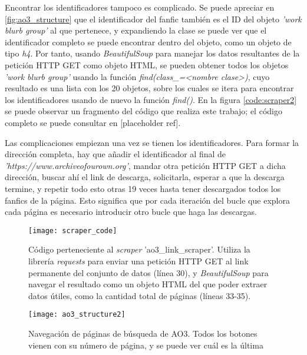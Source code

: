 \documentclass{pre-tfg}
\newcommand{\refToLinkScraperCode}{[placeholder ref]}
\begin{document}
Encontrar los identificadores tampoco es complicado. Se puede apreciar en \ref{fig:ao3_structure} que el identificador del fanfic también es el ID del objeto \textit{'work blurb group'} al que pertenece, y expandiendo la clase se puede ver que el identificador completo se puede encontrar dentro del objeto, como un objeto de tipo \textit{h4}. Por tanto, usando \textit{BeautifulSoup} para manejar los datos resultantes de la petición HTTP GET como objeto HTML, se pueden obtener todos los objetos \textit{'work blurb group'} usando la función \textit{find(class\_=<nombre clase>)}, cuyo resultado es una lista con los 20 objetos, sobre los cuales se itera para encontrar los identificadores usando de nuevo la función \textit{find()}. En la figura \ref{code:scraper2} se puede observar un fragmento del código que realiza este trabajo; el código completo se puede consultar en \refToLinkScraperCode.

Las complicaciones empiezan una vez se tienen los identificadores. Para formar la dirección completa, hay que añadir el identificador al final de \textit{'https://www.archiveofourown.org'}, mandar otra petición HTTP GET a dicha dirección, buscar ahí el link de descarga, solicitarla, esperar a que la descarga termine, y repetir todo esto otras 19 veces hasta tener descargados todos los fanfics de la página. Esto significa que por cada iteración del bucle que explora cada página es necesario introducir otro bucle que haga las descargas.

\begin{figure}
	\texttt{[image: scraper\_code]}
	\caption{Código perteneciente al \textit{scraper} 'ao3\_link\_scraper'. Utiliza la librería \textit{requests} para enviar una petición HTTP GET al link permanente del conjunto de datos (línea 30), y \textit{BeautifulSoup} para navegar el resultado como un objeto HTML del que poder extraer datos útiles, como la cantidad total de páginas (líneas 33-35).}
	\label{code:scraper1}
	\centering
\end{figure}

\begin{SCfigure}
	\caption{Navegación de páginas de búsqueda de AO3. Todos los botones vienen con su número de página, y se puede ver cuál es la última}
	\label{fig:ao3_structure2}
	\texttt{[image: ao3\_structure2]}
\end{SCfigure}
\end{document}
